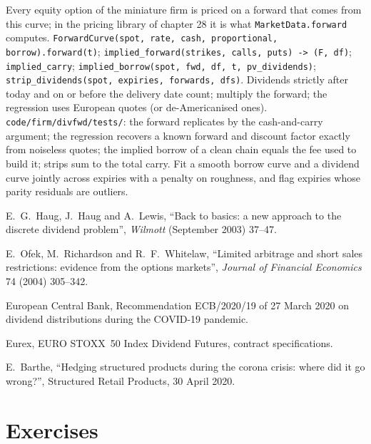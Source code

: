 \begin{build}
 Every equity option of the miniature firm is priced on a forward that
comes from this curve; in the pricing library of chapter 28 it is what
\texttt{MarketData.forward} computes.
 \texttt{ForwardCurve(spot, rate, cash, proportional,
borrow).forward(t)}; \texttt{implied\_forward(strikes, calls, puts) -> (F, df)};
\texttt{implied\_carry}; \texttt{implied\_borrow(spot, fwd, df, t, pv\_dividends)};
\texttt{strip\_dividends(spot, expiries, forwards, dfs)}.
 Dividends strictly after today and on or before the delivery date count;
 multiply the forward; the regression uses European quotes (or
de-Americanised ones).
 \texttt{code/firm/divfwd/tests/}: the forward replicates by the
cash-and-carry argument; the regression recovers a known forward and discount factor
exactly from noiseless quotes; the implied borrow of a clean chain equals the fee used
to build it; strips sum to the total carry.
 Fit a smooth borrow curve and a dividend curve jointly across expiries
with a penalty on roughness, and flag expiries whose parity residuals are outliers.
\end{build}

\begin{omsources}
\item E.~G.~Haug, J.~Haug and A.~Lewis, ``Back to basics: a new approach to the
discrete dividend problem'', \emph{Wilmott} (September 2003) 37--47.
\item E.~Ofek, M.~Richardson and R.~F.~Whitelaw, ``Limited arbitrage and short sales
restrictions: evidence from the options markets'', \emph{Journal of Financial
Economics} 74 (2004) 305--342.
\item European Central Bank, Recommendation ECB/2020/19 of 27 March 2020 on dividend
distributions during the COVID-19 pandemic.
\item Eurex, EURO STOXX~50 Index Dividend Futures, contract specifications.
\item E.~Barthe, ``Hedging structured products during the corona crisis: where did it
go wrong?'', Structured Retail Products, 30 April 2020.
\end{omsources}

\section{Exercises}

